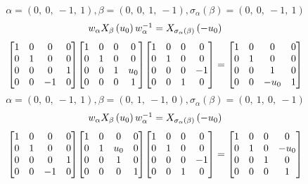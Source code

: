 \documentclass[11pt]{article}
\theoremstyle{definition}
\begin{document}
\[
\alpha = \left( 0, \  0, \  -1, \  1\right), \beta = \left( 0, \  0, \  1, \  -1\right), \sigma_{\alpha}(\beta) = \left( 0, \  0, \  -1, \  1\right)
\]
\[
\scaletoalign{\textwidth}{w_{\alpha} X_{\beta}\left(u_{0}\right) w_{\alpha}^{-1} = X_{\sigma_{\alpha}\left(\beta\right)}\left(- u_{0}\right)}
\]
\[
\scaletoalign{\textwidth}{{\left[\begin{matrix}1 & 0 & 0 & 0\\0 & 1 & 0 & 0\\0 & 0 & 0 & 1\\0 & 0 & -1 & 0\end{matrix}\right]} {\left[\begin{matrix}1 & 0 & 0 & 0\\0 & 1 & 0 & 0\\0 & 0 & 1 & u_{0}\\0 & 0 & 0 & 1\end{matrix}\right]} {\left[\begin{matrix}1 & 0 & 0 & 0\\0 & 1 & 0 & 0\\0 & 0 & 0 & -1\\0 & 0 & 1 & 0\end{matrix}\right]} = {\left[\begin{matrix}1 & 0 & 0 & 0\\0 & 1 & 0 & 0\\0 & 0 & 1 & 0\\0 & 0 & - u_{0} & 1\end{matrix}\right]}}
\]
\[
\alpha = \left( 0, \  0, \  -1, \  1\right), \beta = \left( 0, \  1, \  -1, \  0\right), \sigma_{\alpha}(\beta) = \left( 0, \  1, \  0, \  -1\right)
\]
\[
\scaletoalign{\textwidth}{w_{\alpha} X_{\beta}\left(u_{0}\right) w_{\alpha}^{-1} = X_{\sigma_{\alpha}\left(\beta\right)}\left(- u_{0}\right)}
\]
\[
\scaletoalign{\textwidth}{{\left[\begin{matrix}1 & 0 & 0 & 0\\0 & 1 & 0 & 0\\0 & 0 & 0 & 1\\0 & 0 & -1 & 0\end{matrix}\right]} {\left[\begin{matrix}1 & 0 & 0 & 0\\0 & 1 & u_{0} & 0\\0 & 0 & 1 & 0\\0 & 0 & 0 & 1\end{matrix}\right]} {\left[\begin{matrix}1 & 0 & 0 & 0\\0 & 1 & 0 & 0\\0 & 0 & 0 & -1\\0 & 0 & 1 & 0\end{matrix}\right]} = {\left[\begin{matrix}1 & 0 & 0 & 0\\0 & 1 & 0 & - u_{0}\\0 & 0 & 1 & 0\\0 & 0 & 0 & 1\end{matrix}\right]}}
\]
\end{document}

